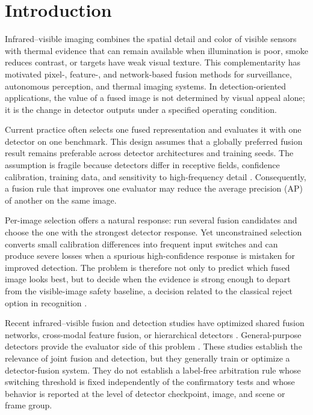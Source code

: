 \documentclass[preprint,11pt]{elsarticle}
\begin{document}
\section{Introduction}

Infrared--visible imaging combines the spatial detail and color of visible
sensors with thermal evidence that can remain available when illumination is
poor, smoke reduces contrast, or targets have weak visual texture. This
complementarity has motivated pixel-, feature-, and network-based fusion methods
for surveillance, autonomous perception, and thermal imaging systems.
\cite{ma2019survey,mudavath2026review,zhu2017tophat,zhang2020,ma2019fusiongan,li2019densefuse,xu2022u2fusion,li2021rfn,yi2024diffif,yang2025lfdt}
In detection-oriented applications, the value of a fused image is not determined
by visual appeal alone; it is the change in detector outputs under a specified
operating condition.

Current practice often selects one fused representation and evaluates it with
one detector on one benchmark. This design assumes that a globally preferred
fusion result remains preferable across detector architectures and training
seeds. The assumption is fragile because detectors differ in receptive fields,
confidence calibration, training data, and sensitivity to high-frequency
detail \cite{abdar2021uncertainty,gawlikowski2023uncertainty}. Consequently, a
fusion rule that improves one evaluator may reduce the average precision (AP)
of another on the same image.

Per-image selection offers a natural response: run several fusion candidates
and choose the one with the strongest detector response. Yet unconstrained
selection converts small calibration differences into frequent input switches
and can produce severe losses when a spurious high-confidence response is
mistaken for improved detection. The problem is therefore not only to predict
which fused image looks best, but to decide when the evidence is strong enough
to depart from the visible-image safety baseline, a decision related to the
classical reject option in recognition \cite{chow1970reject}.

Recent infrared--visible fusion and detection studies have optimized shared
fusion networks, cross-modal feature fusion, or hierarchical detectors
\cite{zhao2025cmifdf,gao2026coifsd,an2026mrtdetr,zhang2026hffn}.
General-purpose detectors provide the evaluator side of this problem
\cite{redmon2016yolo,zhao2024rtdetr}. These studies
establish the relevance of joint fusion and detection, but they generally train
or optimize a detector-fusion system. They do not establish a label-free
arbitration rule whose switching threshold is fixed independently of the
confirmatory tests and whose behavior is reported at the level of detector
checkpoint, image, and scene or frame group.
\end{document}
